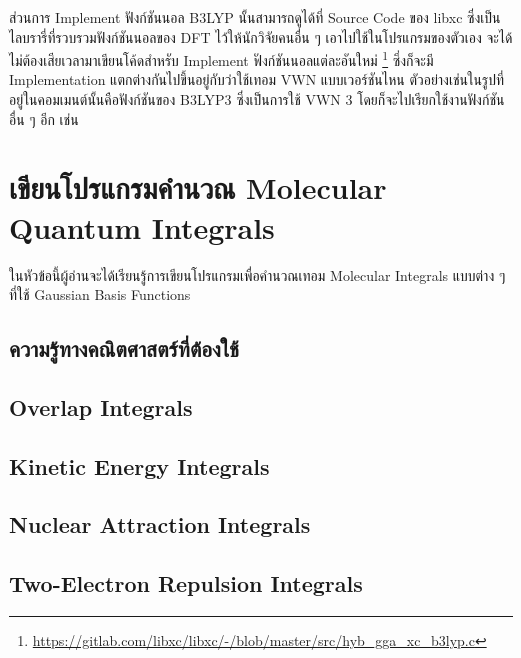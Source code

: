 ส่วนการ Implement ฟังก์ชันนอล B3LYP นั้นสามารถดูได้ที่ Source Code ของ libxc ซึ่งเป็นไลบรารี่ที่รวบรวมฟังก์ชันนอลของ DFT
ไว้ให้นักวิจัยคนอื่น ๆ เอาไปใช้ในโปรแกรมของตัวเอง จะได้ไม่ต้องเสียเวลามาเขียนโค้ดสำหรับ Implement ฟังก์ชันนอลแต่ละอันใหม่%
\footnote{\url{https://gitlab.com/libxc/libxc/-/blob/master/src/hyb_gga_xc_b3lyp.c}} ซึ่งก็จะมี Implementation
แตกต่างกันไปขึ้นอยู่กับว่าใช้เทอม VWN แบบเวอร์ชันไหน ตัวอย่างเช่นในรูปที่อยู่ในคอมเมนต์นั้นคือฟังก์ชันของ B3LYP3 ซึ่งเป็นการใช้ VWN 3
โดยก็จะไปเรียกใช้งานฟังก์ชันอื่น ๆ อีก เช่น 

\section{เขียนโปรแกรมคำนวณ Molecular Quantum Integrals }

ในหัวข้อนี้ผู้อ่านจะได้เรียนรู้การเขียนโปรแกรมเพื่อคำนวณเทอม Molecular Integrals แบบต่าง ๆ ที่ใช้ Gaussian Basis Functions

\subsection{ความรู้ทางคณิตศาสตร์ที่ต้องใช้}

\subsection{Overlap Integrals}

\subsection{Kinetic Energy Integrals}

\subsection{Nuclear Attraction Integrals}

\subsection{Two-Electron Repulsion Integrals}

